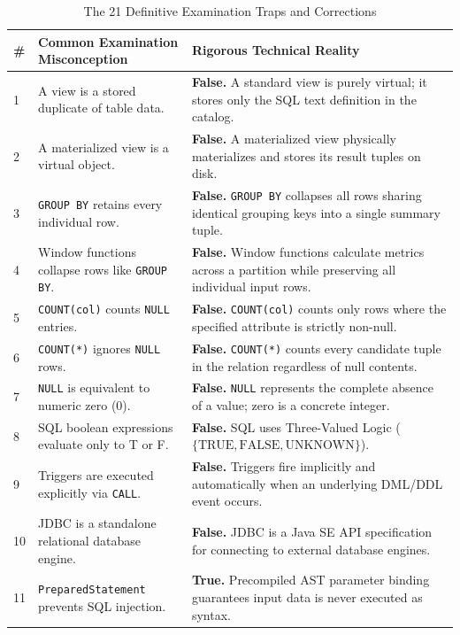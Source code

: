 \begin{table}[htbp]
\centering
\scriptsize
\caption{The 21 Definitive Examination Traps and Corrections}
\label{tab:21_traps}
\begin{tabularx}{\textwidth}{l p{4.5cm} X}
\toprule
\textbf{\#} & \textbf{Common Examination Misconception} & \textbf{Rigorous Technical Reality} \\
\midrule
1 & A view is a stored duplicate of table data. & \textbf{False.} A standard view is purely virtual; it stores only the SQL text definition in the catalog. \\
2 & A materialized view is a virtual object. & \textbf{False.} A materialized view physically materializes and stores its result tuples on disk. \\
3 & \texttt{GROUP BY} retains every individual row. & \textbf{False.} \texttt{GROUP BY} collapses all rows sharing identical grouping keys into a single summary tuple. \\
4 & Window functions collapse rows like \texttt{GROUP BY}. & \textbf{False.} Window functions calculate metrics across a partition while preserving all individual input rows. \\
5 & \texttt{COUNT(col)} counts \texttt{NULL} entries. & \textbf{False.} \texttt{COUNT(col)} counts only rows where the specified attribute is strictly non-null. \\
6 & \texttt{COUNT(*)} ignores \texttt{NULL} rows. & \textbf{False.} \texttt{COUNT(*)} counts every candidate tuple in the relation regardless of null contents. \\
7 & \texttt{NULL} is equivalent to numeric zero ($0$). & \textbf{False.} \texttt{NULL} represents the complete absence of a value; zero is a concrete integer. \\
8 & SQL boolean expressions evaluate only to T or F. & \textbf{False.} SQL uses Three-Valued Logic ($\{\text{TRUE}, \text{FALSE}, \text{UNKNOWN}\}$). \\
9 & Triggers are executed explicitly via \texttt{CALL}. & \textbf{False.} Triggers fire implicitly and automatically when an underlying DML/DDL event occurs. \\
10 & JDBC is a standalone relational database engine. & \textbf{False.} JDBC is a Java SE API specification for connecting to external database engines. \\
11 & \texttt{PreparedStatement} prevents SQL injection. & \textbf{True.} Precompiled AST parameter binding guarantees input data is never executed as syntax. \\

\end{tabularx}
\end{table}
